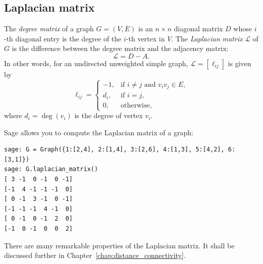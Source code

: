 %



\subsection{Laplacian matrix}

The \emph{degree matrix} of a graph $G = (V,E)$ is an $n \times n$
diagonal matrix $D$ whose $i$-th diagonal entry is the degree of the
$i$-th vertex in $V$. The \emph{Laplacian matrix} $\mathcal{L}$ of $G$
is the difference between the degree matrix and the adjacency matrix:
\[
\mathcal{L} = D - A.
\]
In other words, for an undirected unweighted simple graph,
$\mathcal{L} = [\ell_{ij}]$ is given by
\[
\ell_{ij}
=
\begin{cases}
-1,  & \text{if $i \neq j$ and $v_i v_j \in E$}, \\
d_i, & \text{if $i = j$}, \\
0,   & \text{otherwise},
\end{cases}
\]
where $d_i = \deg(v_i)$ is the degree of vertex $v_i$.

Sage allows you to compute the Laplacian matrix of a graph:
%
\begin{lstlisting}
sage: G = Graph({1:[2,4], 2:[1,4], 3:[2,6], 4:[1,3], 5:[4,2], 6:[3,1]})
sage: G.laplacian_matrix()
[ 3 -1  0 -1  0 -1]
[-1  4 -1 -1 -1  0]
[ 0 -1  3 -1  0 -1]
[-1 -1 -1  4 -1  0]
[ 0 -1  0 -1  2  0]
[-1  0 -1  0  0  2]
\end{lstlisting}
%
There are many remarkable properties of the Laplacian matrix. It shall
be discussed further in Chapter~\ref{chap:distance_connectivity}.



